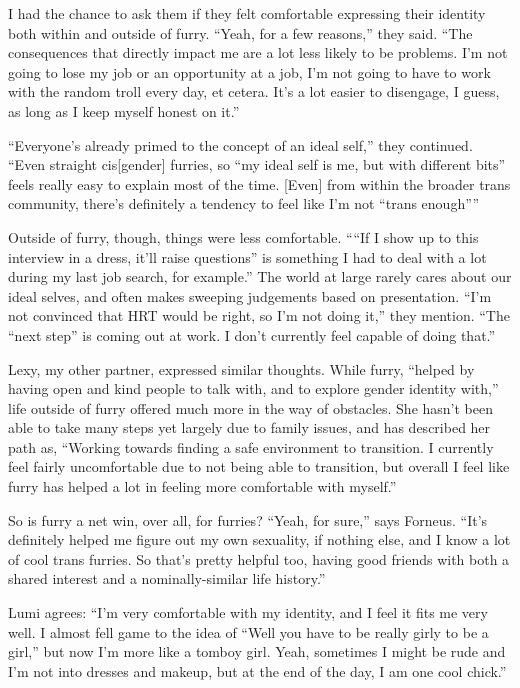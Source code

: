 I had the chance to ask them if they felt comfortable expressing their identity both within and outside of furry.  ``Yeah, for a few reasons,'' they said.  ``The consequences that directly impact me are a lot less likely to be problems. I'm not going to lose my job or an opportunity at a job, I'm not going to have to work with the random troll every day, et cetera.  It's a lot easier to disengage, I guess, as long as I keep myself honest on it.''

``Everyone's already primed to the concept of an ideal self,'' they continued. ``Even straight cis[gender] furries, so ``my ideal self is me, but with different bits'' feels really easy to explain most of the time.
[Even] from within the broader trans community, there's definitely a tendency to feel like I'm not ``trans enough''''

Outside of furry, though, things were less comfortable.  ````If I show up to this interview in a dress, it'll raise questions'' is something I had to deal with a lot during my last job search, for example.''  The world at large rarely cares about our ideal selves, and often makes sweeping judgements based on presentation.  ``I'm not convinced that HRT would be right, so I'm not doing it,'' they mention.  ``The ``next step'' is coming out at work. I don't currently feel capable of doing that.''

Lexy, my other partner, expressed similar thoughts.  While furry, ``helped by having open and kind people to talk with, and to explore gender identity with,'' life outside of furry offered much more in the way of obstacles.  She hasn't been able to take many steps yet largely due to family issues, and has described her path as, ``Working towards finding a safe environment to transition.  I currently feel fairly uncomfortable due to not being able to transition, but overall I feel like furry has helped a lot in feeling more comfortable with myself.''

So is furry a net win, over all, for furries? ``Yeah, for sure,'' says Forneus.  ``It's definitely helped me figure out my own sexuality, if nothing else, and I know a lot of cool trans furries.  So that's pretty helpful too, having good friends with both a shared interest and a nominally-similar life history.''

Lumi agrees: ``I'm very comfortable with my identity, and I feel it fits me very well. I almost fell game to the idea of ``Well you have to be really girly to be a girl,'' but now I'm more like a tomboy girl. Yeah, sometimes I might be rude and I'm not into dresses and makeup, but at the end of the day, I am one cool chick.''

